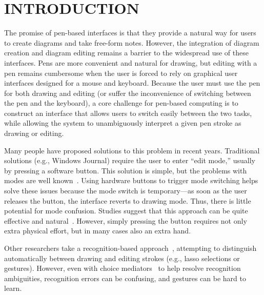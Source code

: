 \documentclass{article}
\begin{document}




\section{INTRODUCTION}

The promise of pen-based interfaces is that they provide a natural way
for users to create diagrams and take free-form notes.  However, the
integration of diagram creation and diagram editing remains a barrier
to the widespread use of these interfaces.  Pens are more convenient
and natural for drawing, but editing with a pen remains cumbersome
when the user is forced to rely on graphical user interfaces designed
for a mouse and keyboard.  Because the user must use the pen for both
drawing and editing (or suffer the inconvenience of switching between
the pen and the keyboard), a core challenge for pen-based computing is
to construct an interface that allows users to switch easily between
the two tasks, while allowing the system to unambiguously interpret a
given pen stroke as drawing or editing.

Many people have proposed solutions to this problem in recent years.  
Traditional solutions (e.g., Windows Journal) require the user to
enter ``edit mode,'' usually by pressing a software button.  This
solution is simple, but the problems with modes are well
known~\cite{Tesler1981Smalltalk}.  Using hardware buttons to trigger mode switching
helps solve these issues because the mode switch is temporary---as
soon as the user releases the button, the interface reverts to drawing
mode.  Thus, there is little potential for mode confusion.  Studies
suggest that this approach can be quite effective and
natural~\cite{Li2005Experimental,Hinckley2006Springboard}.  However,
simply pressing the button requires not only extra physical effort,
but in many cases also an extra hand.

Other researchers take a recognition-based
approach~\cite{Saund2003Stylus,Zeleznik2008Lineogrammer}, 
attempting to distinguish
automatically between drawing and editing strokes (e.g., lasso
selections or gestures).  However, even with choice
mediators~\cite{Mankoff2000Providing} to help resolve recognition
ambiguities, recognition errors can be confusing, and gestures
can be hard to learn.  
\end{document}
